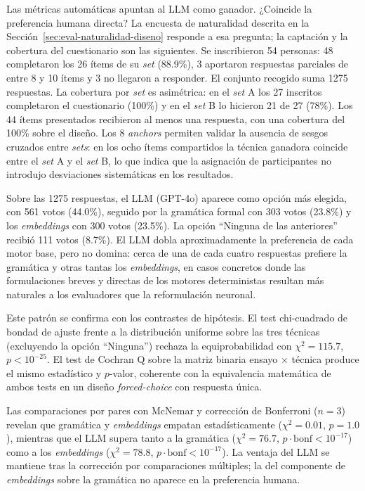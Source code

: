 Las métricas automáticas apuntan al LLM como ganador. ¿Coincide la preferencia humana directa? La encuesta de naturalidad descrita en la Sección~\ref{sec:eval-naturalidad-diseno} responde a esa pregunta; la captación y la cobertura del cuestionario son las siguientes. Se inscribieron 54 personas: 48 completaron los 26 ítems de su \textit{set} (88.9\%), 3 aportaron respuestas parciales de entre 8 y 10 ítems y 3 no llegaron a responder. El conjunto recogido suma 1275 respuestas. La cobertura por \textit{set} es asimétrica: en el \textit{set} A los 27 inscritos completaron el cuestionario (100\%) y en el \textit{set} B lo hicieron 21 de 27 (78\%). Los 44 ítems presentados recibieron al menos una respuesta, con una cobertura del 100\% sobre el diseño. Los 8 \textit{anchors} permiten validar la ausencia de sesgos cruzados entre \textit{sets}: en los ocho ítems compartidos la técnica ganadora coincide entre el \textit{set} A y el \textit{set} B, lo que indica que la asignación de participantes no introdujo desviaciones sistemáticas en los resultados.

Sobre las 1275 respuestas, el LLM (GPT-4o) aparece como opción más elegida, con 561 votos (44.0\%), seguido por la gramática formal con 303 votos (23.8\%) y los \textit{embeddings} con 300 votos (23.5\%). La opción ``Ninguna de las anteriores'' recibió 111 votos (8.7\%). El LLM dobla aproximadamente la preferencia de cada motor base, pero no domina: cerca de una de cada cuatro respuestas prefiere la gramática y otras tantas los \textit{embeddings}, en casos concretos donde las formulaciones breves y directas de los motores deterministas resultan más naturales a los evaluadores que la reformulación neuronal.

Este patrón se confirma con los contrastes de hipótesis. El test chi-cuadrado de bondad de ajuste frente a la distribución uniforme sobre las tres técnicas (excluyendo la opción ``Ninguna'') rechaza la equiprobabilidad con $\chi^2 = 115.7$, $p < 10^{-25}$. El test de Cochran Q sobre la matriz binaria ensayo $\times$ técnica produce el mismo estadístico y $p$-valor, coherente con la equivalencia matemática de ambos tests en un diseño \textit{forced-choice} con respuesta única.

Las comparaciones por pares con McNemar y corrección de Bonferroni ($n = 3$) revelan que gramática y \textit{embeddings} empatan estadísticamente ($\chi^2 = 0.01$, $p = 1.0$), mientras que el LLM supera tanto a la gramática ($\chi^2 = 76.7$, $p \cdot \text{bonf} < 10^{-17}$) como a los \textit{embeddings} ($\chi^2 = 78.8$, $p \cdot \text{bonf} < 10^{-17}$). La ventaja del LLM se mantiene tras la corrección por comparaciones múltiples; la del componente de \textit{embeddings} sobre la gramática no aparece en la preferencia humana.

